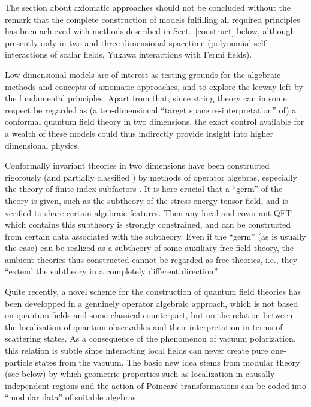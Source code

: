 \documentclass[multphys,vecphys]{svmult}
\begin{document}
The section about
axiomatic approaches should not be concluded
without the remark that the complete construction of models fulfilling
all required principles has been achieved with methods described in
Sect.~\ref{construct} below, although presently only in two and three
dimensional spacetime (polynomial
self-interactions of scalar fields, Yukawa interactions with Fermi 
fields). 

Low-dimensional models are of interest as testing grounds for the
algebraic methods and concepts of axiomatic approaches, and to explore
the leeway left by the fundamental principles. Apart from that, since
string theory can in some respect be regarded as (a ten-dimensional
``target space re-interpretation'' of) a conformal quantum field
theory in two dimensions, the exact control
available for a wealth of these models could thus indirectly provide
insight into higher dimensional physics.  

Conformally invariant theories in two dimensions have been
constructed rigorously (and partially classified \cite{KL}) by methods of
operator algebras, especially the theory of finite index subfactors
\cite{LR}. It is here crucial that a ``germ'' of the theory is given,
such as the subtheory of the stress-energy tensor field, and is verified to
share certain algebraic features. Then any local and covariant QFT
which contains this subtheory is strongly constrained, and can be
constructed from certain data associated with the subtheory. Even
if the ``germ'' (as is usually the case) can be realized as a
subtheory of some auxiliary free field theory, the ambient theories
thus constructed cannot be regarded as free theories, i.e., they
``extend the subtheory in a completely different direction''.

Quite recently, a novel scheme for the construction of quantum field
theories has been developped in a genuinely operator
algebraic approach, which is not based on
quantum fields and some classical counterpart, but on the relation
between the localization of quantum observables and their
interpretation in terms of scattering states. As a consequence of the  
phenomenon of vacuum polarization, this relation is subtle since
interacting local fields can never create pure one-particle
states from the vacuum. The basic new idea stems from
modular theory (see below) by which geometric properties such as
localization in causally independent regions and the action of
Poincar\'e transformations can be coded into ``modular data'' of
suitable algebras. 
\end{document}
